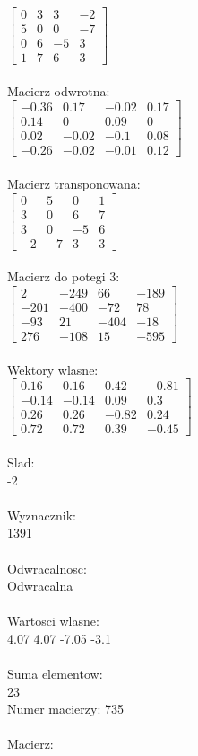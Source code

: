 \documentclass[a4paper,12pt]{article}
\begin{document}
$\begin{bmatrix} 0&3&3&-2\\5&0&0&-7\\0&6&-5&3\\1&7&6&3 \end{bmatrix}$
\\
\\
Macierz odwrotna:\\

$\begin{bmatrix} -0.36&0.17&-0.02&0.17\\0.14&0&0.09&0\\0.02&-0.02&-0.1&0.08\\-0.26&-0.02&-0.01&0.12 \end{bmatrix}$
\\
\\
Macierz transponowana:\\

$\begin{bmatrix} 0&5&0&1\\3&0&6&7\\3&0&-5&6\\-2&-7&3&3 \end{bmatrix}$
\\
\\
Macierz do potegi 3:\\

$\begin{bmatrix} 2&-249&66&-189\\-201&-400&-72&78\\-93&21&-404&-18\\276&-108&15&-595 \end{bmatrix}$
\\
\\
Wektory wlasne:\\

$\begin{bmatrix} 0.16&0.16&0.42&-0.81\\-0.14&-0.14&0.09&0.3\\0.26&0.26&-0.82&0.24\\0.72&0.72&0.39&-0.45 \end{bmatrix}$
\\
\\
Slad:\\
-2
\\
\\
Wyznacznik:\\
1391
\\
\\
Odwracalnosc:\\
Odwracalna
\\
\\
Wartosci wlasne:\\
4.07 4.07 -7.05 -3.1
\\
\\
Suma elementow:\\
23
\\
\newpage
Numer macierzy:
735
\\
\\
Macierz:\\
\end{document}
